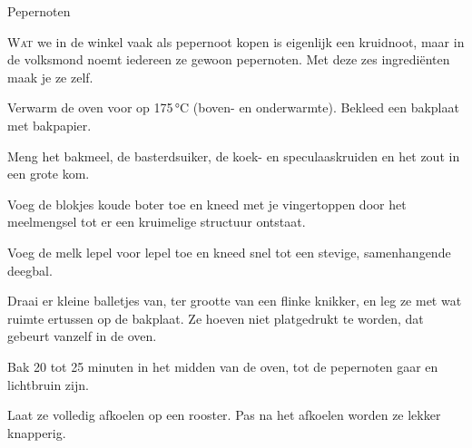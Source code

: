 \begin{recipe}{Pepernoten}


\lettrine{W}{at} we in de winkel vaak als pepernoot kopen is eigenlijk een
kruidnoot, maar in de volksmond noemt iedereen ze gewoon pepernoten. Met deze
zes ingrediënten maak je ze zelf.

\begin{ingredients}
\end{ingredients}

\begin{steps}
  \item Verwarm de oven voor op 175\,°C (boven- en onderwarmte). Bekleed een bakplaat
        met bakpapier.
  \item Meng het bakmeel, de basterdsuiker, de koek- en speculaaskruiden en het
        zout in een grote kom.
  \item Voeg de blokjes koude boter toe en kneed met je vingertoppen door het
        meelmengsel tot er een kruimelige structuur ontstaat.
  \item Voeg de melk lepel voor lepel toe en kneed snel tot een stevige,
        samenhangende deegbal.
  \item Draai er kleine balletjes van, ter grootte van een flinke knikker, en
        leg ze met wat ruimte ertussen op de bakplaat. Ze hoeven niet platgedrukt
        te worden, dat gebeurt vanzelf in de oven.
  \item Bak 20 tot 25 minuten in het midden van de oven, tot de pepernoten gaar
        en lichtbruin zijn.
  \item Laat ze volledig afkoelen op een rooster. Pas na het afkoelen worden ze
        lekker knapperig.
\end{steps}
\end{recipe}
